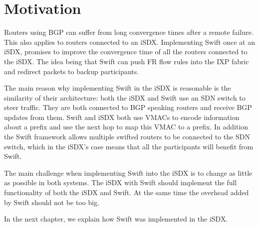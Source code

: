
\chapter{\label{chapter3}Motivation}

Routers using BGP can suffer from long convergence times after a remote failure. This also applies to routers connected to an iSDX. Implementing Swift once at an iSDX, promises to improve the convergence time of all the routers connected to the iSDX. 
The idea being that Swift can push FR flow rules into the IXP fabric and redirect packets to backup participants.

The main reason why implementing Swift in the iSDX is reasonable is the similarity of their architecture: both the iSDX and Swift use an SDN switch to steer traffic. They are both connected to BGP speaking routers and receive BGP updates from them. Swift and iSDX both use VMACs to encode information about a prefix and use the next hop to map this VMAC to a prefix. In addition the Swift framework allows multiple swifted routers to be connected to the SDN switch, which in the iSDX's case means that all the participants will benefit from Swift.

The main challenge when implementing Swift into the iSDX is to change as little as possible in both systems. The iSDX with Swift should implement the full functionality of both the iSDX and Swift. At the same time the overhead added by Swift should not be too big.

In the next chapter, we explain how Swift was implemented in the iSDX. 
